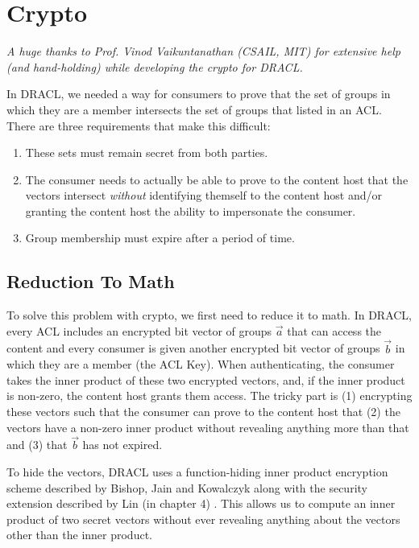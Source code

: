 \documentclass[pdftex,12pt,a4papaer,twoside,notitlepage]{report}
\begin{document}
\chapter{Crypto}

\textit{A huge thanks to Prof. Vinod Vaikuntanathan (CSAIL, MIT) for extensive
  help (and hand-holding) while developing the crypto for DRACL.}

In DRACL, we needed a way for consumers to prove that the set of groups in which
they are a member intersects the set of groups that listed in an ACL. There are
three requirements that make this difficult:

\begin{enumerate}
\item These sets must remain secret from both parties.
\item The consumer needs to actually be able to prove to the content host that
  the vectors intersect \emph{without} identifying themself to the content host
  and/or granting the content host the ability to impersonate the consumer.
\item Group membership must expire after a period of time.
\end{enumerate}

\section{Reduction To Math}

To solve this problem with crypto, we first need to reduce it to math. In DRACL,
every ACL includes an encrypted bit vector of groups $\vec{a}$ that can access
the content and every consumer is given another encrypted bit vector of groups
$\vec{b}$ in which they are a member (the ACL Key). When authenticating, the
consumer takes the inner product of these two encrypted vectors, and, if the
inner product is non-zero, the content host grants them access. The tricky part is
(1) encrypting these vectors such that the consumer can prove to the
content host that (2) the vectors have a non-zero inner product without revealing
anything more than that and (3) that $\vec{b}$ has not expired.

\newcommand{\iprod}[2]{\langle #1,\,#2\rangle}

To hide the vectors, DRACL uses a function-hiding inner product encryption
scheme described by Bishop, Jain and Kowalczyk \cite{inner-product} along with
the security extension described by Lin (in chapter 4) \cite{inner-product-ext}.
This allows us to compute an inner product of two secret vectors without ever
revealing anything about the vectors other than the inner product.
\end{document}
